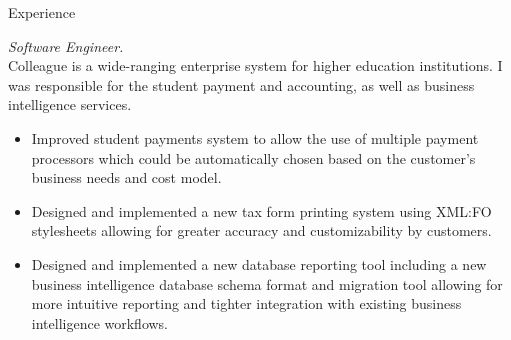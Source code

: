 \documentclass{resume}
\begin{document}
\begin{category}{Experience}
    \begin{itemize}

         \emph{Software Engineer.}\\
            Colleague is a wide-ranging enterprise system for higher education
            institutions. I was responsible for the student payment and
            accounting, as well as business intelligence services.

        \begin{itemize}

            \item Improved student payments system to allow the use of multiple
                payment processors which could be automatically chosen based on the
                customer's business needs and cost model.

            \item Designed and implemented a new tax form printing system using
                XML:FO stylesheets allowing for greater accuracy and customizability
                by customers.

            \item Designed and implemented a new database reporting tool including a
                new business intelligence database schema format and migration tool
                allowing for more intuitive reporting and tighter integration with
                existing business intelligence workflows.

        \end{itemize}

    \end{itemize}

\end{category}
\end{document}
